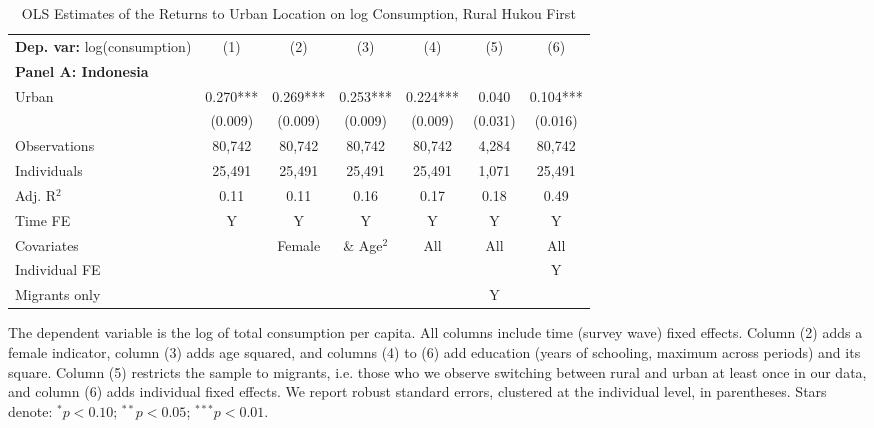 \begin{table}[htbp] \centering \begin{threeparttable}
 \caption{OLS Estimates of the Returns to Urban Location on log Consumption, Rural Hukou First} 
 \label{tab:OLS_CHN_hukou_rural_first_consumption_urban_unb} 
\begin{tabular}{l cccccc} \toprule  \textbf{Dep. var:}  log(consumption) 
                    &\multicolumn{1}{c}{(1)}   &\multicolumn{1}{c}{(2)}   &\multicolumn{1}{c}{(3)}   &\multicolumn{1}{c}{(4)}   &\multicolumn{1}{c}{(5)}   &\multicolumn{1}{c}{(6)}   \\
\textbf{Panel A: Indonesia} \\
Urban               &       0.270***&       0.269***&       0.253***&       0.224***&       0.040   &       0.104***\\
                    &     (0.009)   &     (0.009)   &     (0.009)   &     (0.009)   &     (0.031)   &     (0.016)   \\
\addlinespace
Observations        &      80,742   &      80,742   &      80,742   &      80,742   &       4,284   &      80,742   \\
Individuals         &      25,491   &      25,491   &      25,491   &      25,491   &       1,071   &      25,491   \\
Adj. R$^{2}$        &        0.11   &        0.11   &        0.16   &        0.17   &        0.18   &        0.49   \\
\cmidrule{2 -7} Time FE & Y & Y & Y & Y & Y & Y \\ Covariates & & Female & \& Age$^2$ & All & All & All \\ Individual FE & & & & & & Y \\ Migrants only & & & & & Y & \\ \bottomrule \end{tabular} \begin{tablenotes}[flushleft] \footnotesize \item{The dependent variable is the log of total consumption per capita. All columns include time (survey wave) fixed effects. Column (2) adds a female indicator, column (3) adds age squared, and columns (4) to (6) add education (years of schooling, maximum across periods) and its square. Column (5) restricts the sample to migrants, i.e. those who we observe switching between rural and urban at least once in our data, and column (6) adds individual fixed effects. We report robust standard errors, clustered at the individual level, in parentheses. Stars denote: $^{*} p<0.10$; $^{**} p<0.05$; $^{***} p<0.01$.} \end{tablenotes} \end{threeparttable} \end{table}
